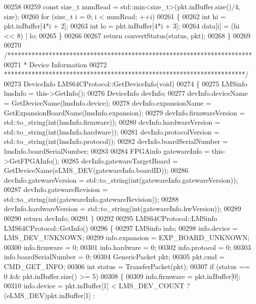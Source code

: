 \begin{DoxyCode}
00258 
00259     \textcolor{keyword}{const} \textcolor{keywordtype}{size\_t} numRead = std::min<size\_t>(pkt.inBuffer.size()/4, size);
00260     \textcolor{keywordflow}{for} (\textcolor{keywordtype}{size\_t} i = 0; i < numRead; ++i)
00261     \{
00262         \textcolor{keywordtype}{int} hi = pkt.inBuffer[4*i + 2];
00263         \textcolor{keywordtype}{int} lo = pkt.inBuffer[4*i + 3];
00264         data[i] = (hi << 8) | lo;
00265     \}
00266 
00267     \textcolor{keywordflow}{return} convertStatus(status, pkt);
00268 \}
00269 
00270 \textcolor{comment}{/***********************************************************************}
00271 \textcolor{comment}{ * Device Information}
00272 \textcolor{comment}{ **********************************************************************/}
00273 DeviceInfo LMS64CProtocol::GetDeviceInfo(\textcolor{keywordtype}{void})
00274 \{
00275     LMSinfo lmsInfo = this->GetInfo();
00276     DeviceInfo devInfo;
00277     devInfo.deviceName = GetDeviceName(lmsInfo.device);
00278     devInfo.expansionName = GetExpansionBoardName(lmsInfo.expansion);
00279     devInfo.firmwareVersion = std::to\_string(\textcolor{keywordtype}{int}(lmsInfo.firmware));
00280     devInfo.hardwareVersion = std::to\_string(\textcolor{keywordtype}{int}(lmsInfo.hardware));
00281     devInfo.protocolVersion = std::to\_string(\textcolor{keywordtype}{int}(lmsInfo.protocol));
00282     devInfo.boardSerialNumber = lmsInfo.boardSerialNumber;
00283 
00284     FPGAinfo gatewareInfo = this->GetFPGAInfo();
00285     devInfo.gatewareTargetBoard = GetDeviceName(eLMS_DEV(gatewareInfo.boardID));
00286     devInfo.gatewareVersion = std::to\_string(\textcolor{keywordtype}{int}(gatewareInfo.gatewareVersion));
00287     devInfo.gatewareRevision = std::to\_string(\textcolor{keywordtype}{int}(gatewareInfo.gatewareRevision));
00288     devInfo.hardwareVersion = std::to\_string(\textcolor{keywordtype}{int}(gatewareInfo.hwVersion));
00289 
00290     \textcolor{keywordflow}{return} devInfo;
00291 \}
00292 
00295 LMS64CProtocol::LMSinfo LMS64CProtocol::GetInfo()
00296 \{
00297     LMSinfo info;
00298     info.device = LMS_DEV_UNKNOWN;
00299     info.expansion = EXP_BOARD_UNKNOWN;
00300     info.firmware = 0;
00301     info.hardware = 0;
00302     info.protocol = 0;
00303     info.boardSerialNumber = 0;
00304     GenericPacket pkt;
00305     pkt.cmd = CMD_GET_INFO;
00306     \textcolor{keywordtype}{int} status = TransferPacket(pkt);
00307     \textcolor{keywordflow}{if} (status == 0 && pkt.inBuffer.size() >= 5)
00308     \{
00309         info.firmware = pkt.inBuffer[0];
00310         info.device = pkt.inBuffer[1] < LMS_DEV_COUNT ? (eLMS_DEV)pkt.inBuffer[1] : 

\end{DoxyCode}
